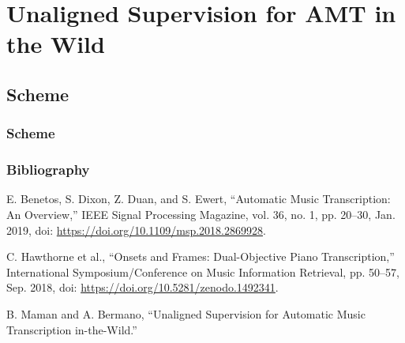 \documentclass{beamer}
\newcommand{\emp}[1]{\textcolor{tum}{\textbf{#1}}}
\begin{document}

\section{Unaligned Supervision for AMT in the Wild}

\subsection{Scheme}
\begin{frame}
	\frametitle{Scheme}

	

\end{frame}































\begin{frame}%
	\frametitle{Bibliography}



	
	\begin{thebibliography}{BenetosMusicTranscription}

		E. Benetos, S. Dixon, Z. Duan, and S. Ewert, “Automatic Music Transcription: An Overview,” IEEE Signal Processing Magazine, vol. 36, no. 1, pp. 20–30, Jan. 2019, doi: \url{https://doi.org/10.1109/msp.2018.2869928}.

		C. Hawthorne et al., “Onsets and Frames: Dual-Objective Piano Transcription,” International Symposium/Conference on Music Information Retrieval, pp. 50–57, Sep. 2018, doi: \url{https://doi.org/10.5281/zenodo.1492341}.

		B. Maman and A. Bermano, “Unaligned Supervision for Automatic Music Transcription in-the-Wild.”

	\end{thebibliography}
\end{frame}
\end{document}
